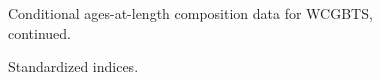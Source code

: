 \documentclass[
]{scrartcl}
\begin{document}
\begin{figure}[H]


\caption{\label{fig-caal_flt10_3}Conditional ages-at-length composition
data for WCGBTS, continued.}

\end{figure}%

\begin{figure}[H]


\caption{\label{fig-All_indices}Standardized indices.}

\end{figure}%
\end{document}
